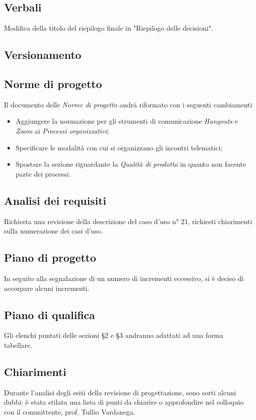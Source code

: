     \subsection{Verbali}
        Modifica della titolo del riepilogo finale in "Riepilogo delle decisioni".
    \subsection{Versionamento}
    \subsection{Norme di progetto}
        Il documento delle \textit{Norme di progetto} andrà riformato con i seguenti cambiamenti
        \begin{itemize}
            \item Aggiungere la normazione per gli strumenti di comunicazione \textit{Hangouts} e \textit{Zoom} ai \textit{Processi organizzativi};
            \item  Specificare le modalità con cui si organizzano gli incontri telematici;
            \item Spostare la sezione riguardante la \textit{Qualità di prodotto} in quanto non facente parte dei processi.
        \end{itemize}
    \subsection{Analisi dei requisiti}
        Richiesta una revisione della descrizione del caso d'uso n° 21, richiesti chiarimenti sulla numerazione dei casi d'uso.
    \subsection{Piano di progetto}
        In seguito alla segnalazione di un numero di incrementi eccessivo, si è deciso di accorpare alcuni incrementi.
    \subsection{Piano di qualifica}
        Gli elenchi puntati delle sezioni §2 e §3 andranno adattati ad una forma tabellare.
    \subsection{Chiarimenti}
        Durante l'analisi degli esiti della revisione di progettazione, sono sorti alcuni dubbi: è stata stilata una lista di punti da chiarire o approfondire nel colloquio con il committente, prof. Tullio Vardanega.
